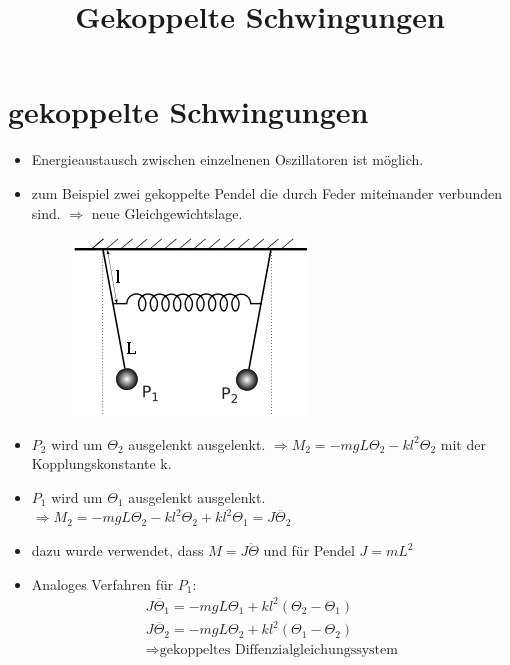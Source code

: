 \documentclass[10pt,a4paper]{article}
\title{Gekoppelte Schwingungen}
\begin{document}
\section*{gekoppelte Schwingungen}
\begin{itemize}
\item Energieaustausch zwischen einzelnenen Oszillatoren ist möglich.
\item zum Beispiel zwei gekoppelte Pendel die durch Feder miteinander verbunden sind. $\Rightarrow$ neue Gleichgewichtslage.
\begin{figure}[hbtp]
\centering
\includegraphics[scale=1]{coupled.png}
\end{figure}

\item $P_2$ wird um $\Theta_2$ ausgelenkt ausgelenkt. $ \Rightarrow M_2=-mgL\Theta_2-kl^2\Theta_2$ mit der Kopplungskonstante k.
\item $P_1$ wird um $\Theta_1$ ausgelenkt ausgelenkt. $ \Rightarrow M_2=-mgL\Theta_2-kl^2\Theta_2+kl^2\Theta_1=J\ddot{\Theta_2}$
\item dazu wurde verwendet, dass $M=J\ddot{\Theta}$ und für Pendel $J=mL^2$
\item Analoges Verfahren für $P_1$:
\begin{align*}
J\ddot{\Theta_1}=-mgL\Theta_1+kl^2(\Theta_2-\Theta_1) \\
J\ddot{\Theta_2}=-mgL\Theta_2+kl^2(\Theta_1-\Theta_2) \\
\Rightarrow \text{gekoppeltes Diffenzialgleichungssystem}
\end{align*}
\end{itemize}
\end{document}
